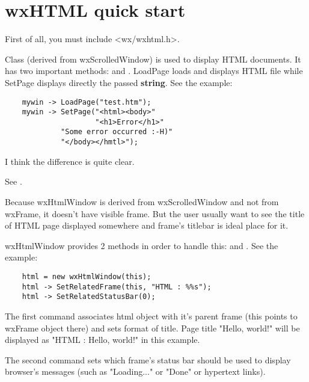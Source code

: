\section{wxHTML quick start}\label{wxhtmlquickstart}


First of all, you must include <wx/wxhtml.h>.

Class  (derived from wxScrolledWindow)
is used to display HTML documents.
It has two important methods:  
and .
LoadPage loads and displays HTML file while SetPage displays directly the
passed {\bf string}. See the example:

\begin{verbatim}
    mywin -> LoadPage("test.htm");
    mywin -> SetPage("<html><body>"
                     "<h1>Error</h1>"
		     "Some error occurred :-H)"
		     "</body></hmtl>");
\end{verbatim}

I think the difference is quite clear.


See .


Because wxHtmlWindow is derived from wxScrolledWindow and not from
wxFrame, it doesn't have visible frame. But the user usually want to see
the title of HTML page displayed somewhere and frame's titlebar is 
ideal place for it.

wxHtmlWindow provides 2 methods in order to handle this: 
 and 
. 
See the example:

\begin{verbatim}
    html = new wxHtmlWindow(this);
    html -> SetRelatedFrame(this, "HTML : %%s");
    html -> SetRelatedStatusBar(0);
\end{verbatim}

The first command associates html object with it's parent frame
(this points to wxFrame object there) and sets format of title.
Page title "Hello, world!" will be displayed as "HTML : Hello, world!"
in this example.

The second command sets which frame's status bar should be used to display
browser's messages (such as "Loading..." or "Done" or hypertext links).

